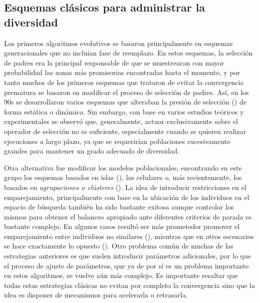 \subsection{Esquemas clásicos para administrar la diversidad}

Los primeros algoritmos evolutivos se basaron principalmente en esquemas generacionales que no incluían fase de reemplazo.
%
En estos esquemas, la selección de padres era la principal responsable de que se muestrearan con mayor probabilidad las zonas más promisorias encontradas hasta el momento, y por tanto muchos de los primeros esquemas que trataron de evitar la convergencia prematura se basaron en modificar el proceso de selección de padres.
%
Así, en los 90s se desarrollaron varios esquemas que alteraban la presión de selección (\cite{eiben2003introduction}) de forma estática o dinámica.
%
Sin embargo, con base en varios estudios teóricos y experimentales se observó que, generalmente, actuar exclusivamente sobre el operador de selección no es suficiente, especialmente cuando se quieren realizar ejecuciones a largo plazo, ya que se requerirían poblaciones excesivamente grandes para mantener un grado adecuado de diversidad.

Otra alternativa fue modificar los modelos poblacionales, encontrando en este grupo los esquemas basados en islas (\cite{alba2005parallel}), los celulares
o, más recientemente, los basados en \textit{agrupaciones o clústeres} (\cite{gao2014cluster}).
%
La idea de introducir restricciones en el emparejamiento, principalmente con base en la ubicación de los individuos en el espacio de búsqueda también ha sido bastante exitosa aunque controlar los mismos para obtener el balanceo apropiado ante diferentes criterios de parada es bastante complejo.
%
En algunos casos resultó ser más prometedor promover el emparejamiento entre individuos no similares (\cite{Joel:CHC}), mientras que en otros escenarios se hace exactamente lo opuesto (\cite{deb1989investigation}).
%
Otro problema común de muchas de las estrategias anteriores es que suelen introducir parámetros adicionales, por lo que el proceso de ajuste de parámetros, que ya de por sí es un problema importante en estos algoritmos, se vuelve aún más complejo.
%
Es importante resaltar que todas estas estrategias clásicas no evitan por completo la convergencia sino que la idea es disponer de mecanismos para acelerarla o retrasarla.

